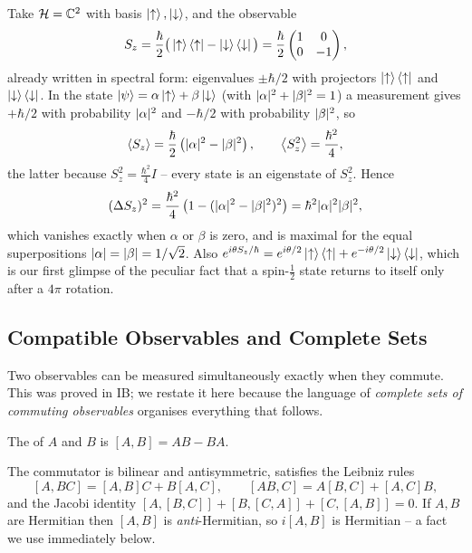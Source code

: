 \documentclass[a4paper]{scrartcl}
\newcommand{\half}{\tfrac{1}{2}}
\begin{document}
\begin{example}
    Take $\mathcal{H} = \mathbb{C}^2$ with basis $\ket{\uparrow}, \ket{\downarrow}$, and the observable
    $$
    S_z = \frac{\hbar}{2}\big( \ket{\uparrow}\bra{\uparrow} - \ket{\downarrow}\bra{\downarrow}\big) = \frac{\hbar}{2}\begin{pmatrix} 1 & 0 \\ 0 & -1 \end{pmatrix},
    $$
    already written in spectral form: eigenvalues $\pm\hbar/2$ with projectors $\ket{\uparrow}\bra{\uparrow}$ and $\ket{\downarrow}\bra{\downarrow}$. In the state $\ket{\psi} = \alpha\ket{\uparrow} + \beta\ket{\downarrow}$ (with $\lvert\alpha\rvert^2 + \lvert\beta\rvert^2 = 1$) a measurement gives $+\hbar/2$ with probability $\lvert\alpha\rvert^2$ and $-\hbar/2$ with probability $\lvert\beta\rvert^2$, so
    $$
    \expval{S_z} = \frac{\hbar}{2}\left( \lvert\alpha\rvert^2 - \lvert\beta\rvert^2 \right), \qquad \expval{S_z^2} = \frac{\hbar^2}{4},
    $$
    the latter because $S_z^2 = \frac{\hbar^2}{4}I$ -- every state is an eigenstate of $S_z^2$. Hence
    $$
    (\Delta S_z)^2 = \frac{\hbar^2}{4}\left(1 - (\lvert\alpha\rvert^2 - \lvert\beta\rvert^2)^2\right) = \hbar^2 \lvert\alpha\rvert^2\lvert\beta\rvert^2,
    $$
    which vanishes exactly when $\alpha$ or $\beta$ is zero, and is maximal for the equal superpositions $\lvert\alpha\rvert = \lvert\beta\rvert = 1/\sqrt2$. Also $e^{i\theta S_z/\hbar} = e^{i\theta/2}\ket{\uparrow}\bra{\uparrow} + e^{-i\theta/2}\ket{\downarrow}\bra{\downarrow}$, which is our first glimpse of the peculiar fact that a spin-$\half$ state returns to itself only after a $4\pi$ rotation.
\end{example}

\subsection{Compatible Observables and Complete Sets}

Two observables can be measured simultaneously exactly when they commute. This was proved in IB; we restate it here because the language of \emph{complete sets of commuting observables} organises everything that follows.

\begin{definition}[Commutator]
    The  of $A$ and $B$ is $[A,B] = AB - BA$.
\end{definition}

The commutator is bilinear and antisymmetric, satisfies the Leibniz rules
$$
[A, BC] = [A,B]C + B[A,C], \qquad [AB, C] = A[B,C] + [A,C]B,
$$
and the Jacobi identity $[A,[B,C]] + [B,[C,A]] + [C,[A,B]] = 0$. If $A, B$ are Hermitian then $[A,B]$ is \emph{anti}-Hermitian, so $i[A,B]$ is Hermitian -- a fact we use immediately below.
\end{document}
